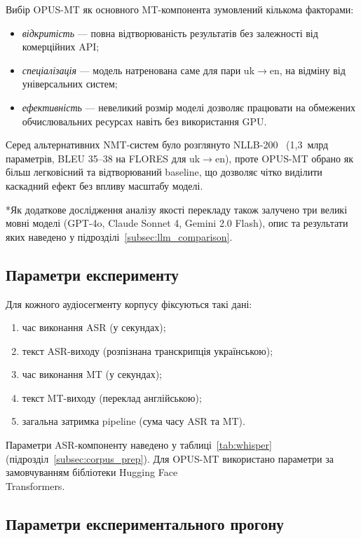 Вибір OPUS-MT як основного MT-компонента зумовлений кількома факторами:
\begin{itemize}[nosep]
    \item \textit{відкритість} --- повна відтворюваність результатів без
    залежності від комерційних API;
    \item \textit{спеціалізація} --- модель натренована саме для пари
    uk$\to$en, на відміну від універсальних систем;
    \item \textit{ефективність} --- невеликий розмір моделі дозволяє
    працювати на обмежених обчислювальних ресурсах навіть без використання GPU.
\end{itemize}

Серед альтернативних NMT-систем було розглянуто NLLB-200~\cite{nllb}
(1,3~млрд параметрів, BLEU 35--38 на FLORES для uk$\to$en), проте OPUS-MT
обрано як більш легковісний та відтворюваний baseline, що дозволяє чітко
виділити каскадний ефект без впливу масштабу моделі.

*Як додаткове дослідження аналізу якості перекладу також залучено три великі мовні
моделі (GPT-4o, Claude Sonnet 4, Gemini 2.0 Flash), опис та результати
яких наведено у підрозділі~\ref{subsec:llm_comparison}.

\subsection{Параметри експерименту}

Для кожного аудіосегменту корпусу фіксуються такі дані:
\begin{enumerate}[nosep]
    \item час виконання ASR (у секундах);
    \item текст ASR-виходу (розпізнана транскрипція українською);
    \item час виконання MT (у секундах);
    \item текст MT-виходу (переклад англійською);
    \item загальна затримка pipeline (сума часу ASR та MT).
\end{enumerate}

Параметри ASR-компоненту наведено у таблиці~\ref{tab:whisper} (підрозділ~\ref{subsec:corpus_prep}).
Для OPUS-MT використано параметри за замовчуванням бібліотеки Hugging Face
\\Transformers.

\subsection{Параметри експериментального прогону}

